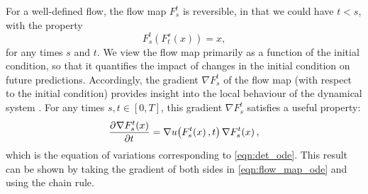 For a well-defined flow, the flow map \(F_s^t\) is reversible, in that we could have \(t < s\), with the property
\[
	F_s^t\!\left(F_t^s\!\left(x\right)\right) = x,
\]
for any times \(s\) and \(t\).
We view the flow map primarily as a function of the initial condition, so that it quantifies the impact of changes in the initial condition on future predictions.
Accordingly, the gradient \(\nabla F_s^t\) of the flow map (with respect to the initial condition) provides insight into the local behaviour of the dynamical system \citep{Arnold_1973_OrdinaryDifferentialEquations,TruesdellNoll_2004_NonLinearFieldTheories}.
For any times \(s, t \in [0,T]\), this gradient	\(\nabla F_s^t\) satisfies a useful property:
\begin{equation}
	\dpd{\nabla F_{s}^{t}\!\left(x\right)}{t} = \nabla u\!\left(F_{s}^{t}\!\left(x\right), t\right) \nabla F_{s}^{t}\!\left(x\right),
	\label{eqn:eqn_of_vars}
\end{equation}
which is the equation of variations corresponding to \cref{eqn:det_ode}.
This result can be shown by taking the gradient of both sides in \cref{eqn:flow_map_ode} and using the chain rule.




